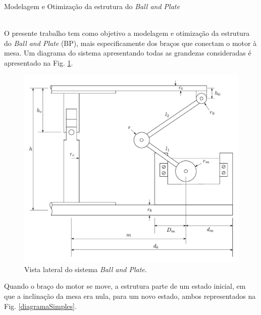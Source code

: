 \documentclass[12pt]{article}
\begin{document}
	\singlespacing %
	
	\thispagestyle{empty}
	
	\begin{center}
		\huge
		Modelagem e Otimização da estrutura do \textit{Ball and Plate} \\~\\
	\end{center}
	
	O presente trabalho tem como objetivo a modelagem e otimização da estrutura do \textit{Ball and Plate} (BP), mais especificamente dos braços que conectam o motor à mesa. Um diagrama do sistema apresentando todas as grandezas consideradas é apresentado na Fig. \ref{diagramaBP}. 
	
	\begin{figure}[H]
		\centering
		\includegraphics[width=1\linewidth]{figuras/diagramaBP.pdf}
		\caption{Vista lateral do sistema \textit{Ball and Plate}.}
		\label{diagramaBP}
	\end{figure}
	
	Quando o braço do motor se move, a estrutura parte de um estado inicial, em que a inclinação da mesa era nula, para um novo estado, ambos representados na Fig. \ref{diagramaSimples}.
	
\end{document}
